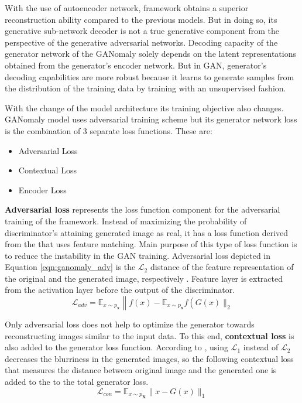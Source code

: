  With the use of autoencoder network, framework obtains a superior reconstruction ability
compared to the previous models. But in doing so, its generative sub-network decoder is not a true
generative component from the perspective of the generative adversarial networks. Decoding capacity of the 
generator network of the GANomaly solely depends on the latent representations obtained from the generator's encoder
network. But in GAN, generator's decoding capabilities are more robust because it learns to generate samples from the 
distribution of the training data by training with an unsupervised fashion.

 With the change of the model architecture its training objective also changes. GANomaly model uses adversarial
training scheme but its generator network loss is the combination of 3 separate loss functions. These
are:
\begin{itemize}
   \item Adversarial Loss
   \item Contextual Loss
   \item Encoder Loss 
\end{itemize} 

\textbf{Adversarial loss} represents the loss function component for the adversarial training of the
framework. Instead of maximizing the probability of discriminator's attaining generated image as
real, it has a loss function derived from the \cite{fm} that uses feature matching. Main purpose
of this type of loss function is to reduce the instability in the GAN training. Adversarial loss
depicted in Equation \ref{eqn:ganomaly_adv} is the $\mathcal{L}_{2}$ distance of the feature
representation of the original and the generated image, respectively \cite{Akay2018GANomalySA}.
Feature layer is extracted from the activation layer before the output of the discriminator.  
\begin{equation}
    \label{eqn:ganomaly_adv}
    \mathcal{L}_{a d v}=\mathbb{E}_{x \sim p_{\mathbf{x}}}\left\|f(x)-\mathbb{E}_{x \sim p_{\mathbf{x}}} f\left(G(x) \|_{2}\right.\right. 
\end{equation}

Only adversarial loss does not help to optimize the generator towards reconstructing images similar
to the input data. To this end, \textbf{contextual loss} is also added to the generator loss function.
According to \cite{Isola2017ImagetoImageTW}, using $\mathcal{L}_1$ instead of $\mathcal{L}_2$
decreases the blurriness in the generated images, so the following contextual loss that measures the
distance between original image and the generated one is added to the to the total generator loss.
\begin{equation}
    \mathcal{L}_{c o n}=\mathbb{E}_{x \sim p_{\mathbf{X}}}\|x-G(x)\|_{1} 
\end{equation}

